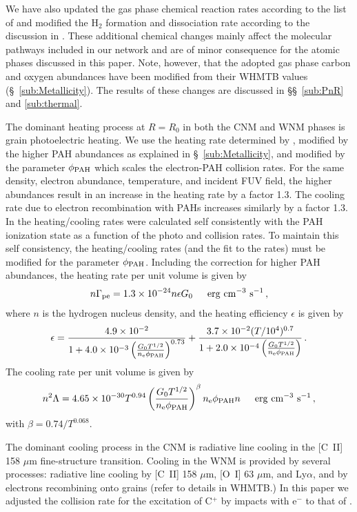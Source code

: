 \documentclass[12pt,preprint,flushrt]{aastex}
\newcommand{\beq}{\begin{equation}}
\newcommand{\eeq}{\end{equation}}
\begin{document}
We have also updated the gas phase
chemical reaction rates according to the list of \cite{mil97} and modified
the H$_2$ formation and dissociation rate according to the discussion in
\cite{kauf99}. These additional chemical changes mainly affect the molecular
pathways included in our network and are of minor consequence for the
atomic phases discussed in this paper. Note, however, that the adopted
gas phase carbon and oxygen
abundances have been modified from their WHMTB values
(\S~\ref{sub:Metallicity}). The results
of these changes are discussed in \S\S~\ref{sub:PnR} and \ref{sub:thermal}.


The dominant heating process at $R=R_0$ in both the
CNM and WNM phases is grain photoelectric heating. We use the
heating rate determined by
\cite{bak94}, modified by the higher PAH abundances as explained in
\S~\ref{sub:Metallicity}, and modified by the parameter
$\phi_{\rm PAH}$ which scales the  electron-PAH collision rates.
For the same density, electron
abundance, temperature,
and incident FUV field, the higher abundances  result in an increase in the
heating rate by a factor 1.3. The cooling rate due to
electron recombination with PAHs increases similarly by
a factor 1.3. In \cite{bak94} the heating/cooling rates were calculated
self consistently with the PAH ionization state as a function
of the photo and  collision rates. To maintain this self consistency,
the heating/cooling rates (and the fit to the rates) must be modified
for the parameter $\phi_{\rm PAH}$. Including the correction for
higher PAH abundances, the  heating rate per unit volume is given by
\beq
n\Gamma_{\rm pe} = 1.3 \times 10^{-24} n \epsilon G_0
\,\,\,\,\,\,\,\,\, {\rm erg\,\,cm^{-3}\,\, s^{-1}}\, ,
\label{eq:gphe1}
\eeq
where $n$ is the hydrogen nucleus density, and 
the heating efficiency $\epsilon$ is given by
\beq
\epsilon = \frac{4.9\times 10^{-2}}
{1 + 4.0\times 10^{-3}\left(\frac{G_0 T^{1/2}}{n_{\rm e} \phi_{\rm PAH}}
  \right)^{0.73}} + \frac{3.7\times 10^{-2} (T/10^4)^{0.7}}
{1 + 2.0\times 10^{-4}\left(\frac{G_0 T^{1/2}}{n_{\rm e} \phi_{\rm PAH}}
  \right)}\, .
\label{eq:eps}
\eeq
The cooling rate per unit volume is given by
\beq
n^2\Lambda = 4.65\times 10^{-30} T^{0.94} \left(
     \frac{G_0 T^{1/2}}{n_{\rm e} \phi_{\rm PAH}}\right)^{\beta}
      n_{\rm e}\phi_{\rm PAH} n
\,\,\,\,\,\,\,\,\, {\rm erg\,\,cm^{-3}\,\, s^{-1}}\, ,
\label{eq:gco1}
\eeq
with $\beta = 0.74/T^{0.068}$.

The dominant cooling process in the CNM is radiative line cooling
in the [C~II] 158 $\mu$m fine-structure transition. Cooling in the WNM is
provided by several processes: radiative line cooling by [C~II] 158 $\mu$m,
[O~I] 63 $\mu$m, and Ly$\alpha$, and by electrons recombining onto
grains (refer to details in WHMTB.)
In this paper we adjusted the collision rate for the excitation
of C$^+$ by impacts with  e$^-$ to that of \cite{blu92}.
\end{document}
